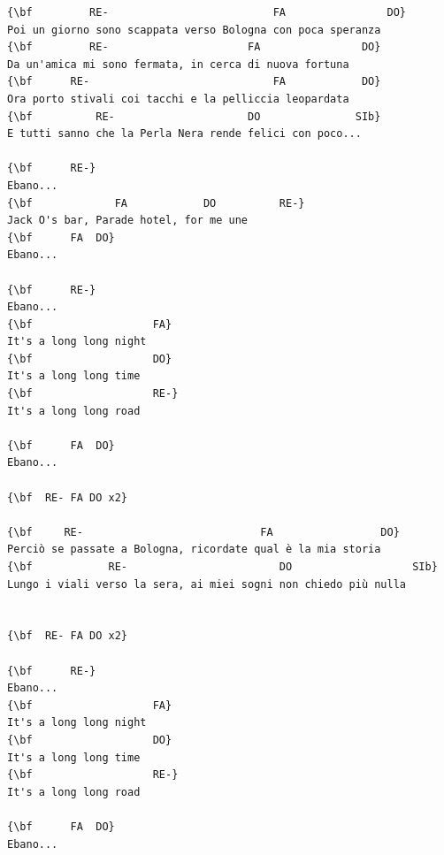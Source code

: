 \documentclass[a4paper]{article}
\begin{document}
\begin{Verbatim}[commandchars=\\\{\}]
{\bf         RE-                          FA                DO}
Poi un giorno sono scappata verso Bologna con poca speranza
{\bf         RE-                      FA                DO}
Da un'amica mi sono fermata, in cerca di nuova fortuna
{\bf      RE-                             FA            DO}
Ora porto stivali coi tacchi e la pelliccia leopardata
{\bf          RE-                     DO               SIb}
E tutti sanno che la Perla Nera rende felici con poco...

{\bf      RE-}
Ebano...
{\bf             FA            DO          RE-}
Jack O's bar, Parade hotel, for me une
{\bf      FA  DO}
Ebano...

{\bf      RE-}
Ebano...
{\bf                   FA}
It's a long long night
{\bf                   DO}
It's a long long time
{\bf                   RE-}
It's a long long road

{\bf      FA  DO}
Ebano...

{\bf  RE- FA DO x2}

{\bf     RE-                            FA                 DO}
Perciò se passate a Bologna, ricordate qual è la mia storia
{\bf            RE-                        DO                   SIb}
Lungo i viali verso la sera, ai miei sogni non chiedo più nulla


{\bf  RE- FA DO x2}

{\bf      RE-}
Ebano...
{\bf                   FA}
It's a long long night
{\bf                   DO}
It's a long long time
{\bf                   RE-}
It's a long long road

{\bf      FA  DO}
Ebano...

\end{Verbatim}
\newpage
\end{document}
